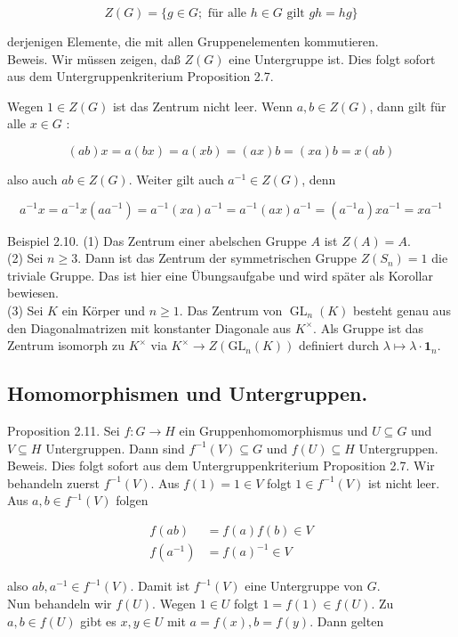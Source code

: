 \documentclass[10pt, letterpaper]{article}
\begin{document}
$$
Z(G)=\{g \in G ; \text { für alle } h \in G \text { gilt } g h=h g\}
$$

derjenigen Elemente, die mit allen Gruppenelementen kommutieren.\\
Beweis. Wir müssen zeigen, daß $Z(G)$ eine Untergruppe ist. Dies folgt sofort aus dem Untergruppenkriterium Proposition 2.7.

Wegen $1 \in Z(G)$ ist das Zentrum nicht leer. Wenn $a, b \in Z(G)$, dann gilt für alle $x \in G$ :

$$
(a b) x=a(b x)=a(x b)=(a x) b=(x a) b=x(a b)
$$

also auch $a b \in Z(G)$. Weiter gilt auch $a^{-1} \in Z(G)$, denn

$$
a^{-1} x=a^{-1} x\left(a a^{-1}\right)=a^{-1}(x a) a^{-1}=a^{-1}(a x) a^{-1}=\left(a^{-1} a\right) x a^{-1}=x a^{-1}
$$

Beispiel 2.10. (1) Das Zentrum einer abelschen Gruppe $A$ ist $Z(A)=A$.\\
(2) Sei $n \geq 3$. Dann ist das Zentrum der symmetrischen Gruppe $Z\left(S_{n}\right)=1$ die triviale Gruppe. Das ist hier eine Übungsaufgabe und wird später als Korollar bewiesen.\\
(3) Sei $K$ ein Körper und $n \geq 1$. Das Zentrum von $\operatorname{GL}_{n}(K)$ besteht genau aus den Diagonalmatrizen mit konstanter Diagonale aus $K^{\times}$. Als Gruppe ist das Zentrum isomorph zu $K^{\times}$ via $K^{\times} \rightarrow Z\left(\mathrm{GL}_{n}(K)\right)$ definiert durch $\lambda \mapsto \lambda \cdot \mathbf{1}_{n}$.

\subsection*{Homomorphismen und Untergruppen.}
Proposition 2.11. Sei $f: G \rightarrow H$ ein Gruppenhomomorphismus und $U \subseteq G$ und $V \subseteq H$ Untergruppen. Dann sind $f^{-1}(V) \subseteq G$ und $f(U) \subseteq H$ Untergruppen.\\
Beweis. Dies folgt sofort aus dem Untergruppenkriterium Proposition 2.7. Wir behandeln zuerst $f^{-1}(V)$. Aus $f(1)=1 \in V$ folgt $1 \in f^{-1}(V)$ ist nicht leer. Aus $a, b \in f^{-1}(V)$ folgen

$$
\begin{aligned}
f(a b) & =f(a) f(b) \in V \\
f\left(a^{-1}\right) & =f(a)^{-1} \in V
\end{aligned}
$$

also $a b, a^{-1} \in f^{-1}(V)$. Damit ist $f^{-1}(V)$ eine Untergruppe von $G$.\\
Nun behandeln wir $f(U)$. Wegen $1 \in U$ folgt $1=f(1) \in f(U)$. Zu $a, b \in f(U)$ gibt es $x, y \in U$ mit $a=f(x), b=f(y)$. Dann gelten
\end{document}
